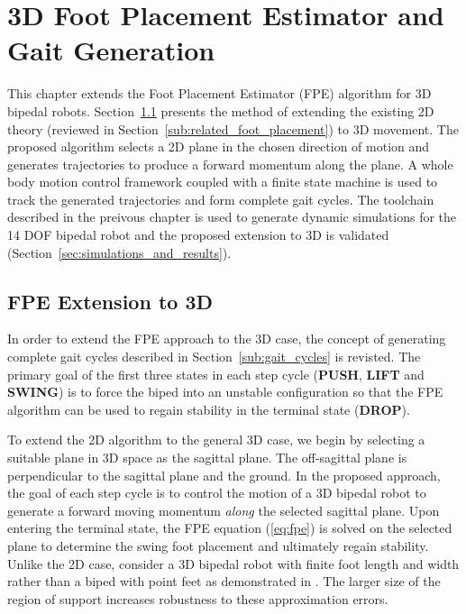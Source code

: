 \chapter{3D Foot Placement Estimator and Gait Generation} %
\label{cha:simulations}

This chapter extends the Foot Placement Estimator (FPE) algorithm for 3D bipedal robots. Section~\ref{sec:extension_to_3d} presents the method of extending the existing 2D theory (reviewed in Section~\ref{sub:related_foot_placement}) to 3D movement. The proposed algorithm selects a 2D plane in the chosen direction of motion and generates trajectories to produce a forward momentum along the plane. A whole body motion control framework coupled with a finite state machine is used to track the generated trajectories and form complete gait cycles. The toolchain described in the preivous chapter is used to generate dynamic simulations for the 14 DOF bipedal robot and the proposed extension to 3D is validated (Section~\ref{sec:simulations_and_results}).

\section{FPE Extension to 3D} %
\label{sec:extension_to_3d}

In order to extend the FPE approach to the 3D case, the concept of generating complete gait cycles described in Section~\ref{sub:gait_cycles} is revisted. The primary goal of the first three states in each step cycle (\textbf{PUSH}, \textbf{LIFT} and \textbf{SWING}) is to force the biped into an unstable configuration so that the FPE algorithm can be used to regain stability in the terminal state (\textbf{DROP}).

To extend the 2D algorithm to the general 3D case, we begin by selecting a suitable plane in 3D space as the sagittal plane. The off-sagittal plane is perpendicular to the sagittal plane and the ground.  In the proposed approach, the goal of each step cycle is to control the motion of a 3D bipedal robot to generate a forward moving momentum \emph{along} the selected sagittal plane. Upon entering the terminal state, the FPE equation (\ref{eq:fpe}) is solved on the selected plane to determine the swing foot placement and ultimately regain stability. Unlike the 2D case, consider a 3D bipedal robot with finite foot length and width rather than a biped with point feet as demonstrated in \cite{Wight:2008vt}. The larger size of the region of support increases robustness to these approximation errors. 

